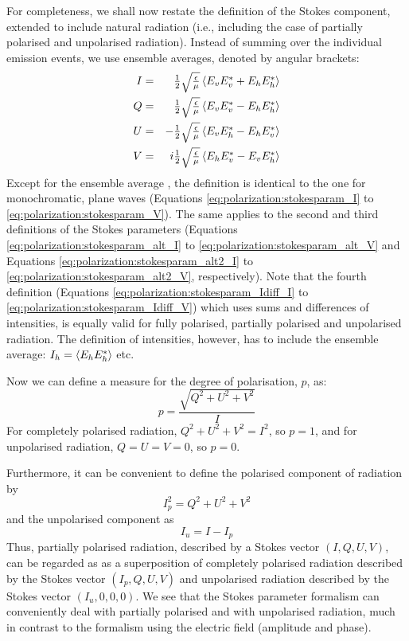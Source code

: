 For completeness, we shall now restate the definition of the Stokes
component, extended to include natural radiation (i.e., including the
case of partially polarised and unpolarised radiation).
Instead of summing over the individual emission events, we use
ensemble averages, denoted by angular brackets:
\begin{eqnarray}
  \label{eq:polarization:stokesparam_I_general}
  I &=& \textstyle\frac{1}{2}\sqrt{\textstyle{\frac{\epsilon}{\mu}}}  \left\langle E_v E_v^\ast + E_h E_h^\ast \right\rangle \\
  \label{eq:polarization:stokesparam_Q_general}
  Q &=&  \textstyle\frac{1}{2}\sqrt{\textstyle{\frac{\epsilon}{\mu}}} \left\langle   E_v E_v^\ast - E_h E_h^\ast \right\rangle \\
  \label{eq:polarization:stokesparam_U_general}
  U &=& - \textstyle\frac{1}{2}\sqrt{\textstyle{\frac{\epsilon}{\mu}}} \left\langle   E_v E_h^\ast - E_h E_v^\ast \right\rangle \\
  \label{eq:polarization:stokesparam_V_general}
  V &=& i \textstyle\frac{1}{2}\sqrt{\textstyle{\frac{\epsilon}{\mu}}} \left\langle E_h E_v^\ast - E_v E_h^\ast \right\rangle
\end{eqnarray}
Except for the ensemble average , the definition is identical to the
one for monochromatic, plane waves (Equations
\ref{eq:polarization:stokesparam_I} to \ref{eq:polarization:stokesparam_V}).
The same applies to the second and third definitions of the Stokes parameters
(Equations \ref{eq:polarization:stokesparam_alt_I} to
\ref{eq:polarization:stokesparam_alt_V} and Equations
\ref{eq:polarization:stokesparam_alt2_I} to
\ref{eq:polarization:stokesparam_alt2_V}, respectively). Note that the fourth
definition (Equations \ref{eq:polarization:stokesparam_Idiff_I} to
\ref{eq:polarization:stokesparam_Idiff_V}) which uses sums and differences of
intensities, is equally valid for fully polarised, partially polarised and
unpolarised radiation. The definition of intensities, however, has to include
the ensemble average: $I_h = \left\langle E_h E_h^\ast \right\rangle$ etc.

Now we can define a measure for
the degree of polarisation, $p$, as:
\begin{equation}
  \label{eq:polarization:pol_degree}
  p = \frac{\sqrt{Q^2 + U^2 + V^2}}{I}
\end{equation}
For completely polarised radiation, $Q^2 + U^2 + V^2 = I^2$, so $p =
1$, and for unpolarised radiation, $Q = U = V = 0$, so $p = 0$.

Furthermore, it can be convenient to define the polarised
component of radiation by
\begin{equation}
  \label{eq:polarization:pol_component}
  I_p^2 = Q^2 + U^2 + V^2
\end{equation}
and the unpolarised component as
\begin{equation}
  \label{eq:polarization:unpol_component}
  I_u = I - I_p
\end{equation}
Thus, partially polarised radiation, described by a Stokes vector $(I,
Q, U, V)$, can be regarded as as a superposition of completely
polarised radiation described by the Stokes vector $(I_p, Q, U, V)$
and unpolarised radiation described by the Stokes vector $(I_u,
0,0,0)$.  We see that the Stokes parameter formalism can conveniently
deal with partially polarised and with unpolarised radiation, much in
contrast to the formalism using the electric field (amplitude and
phase).

